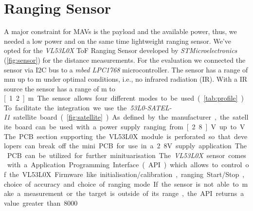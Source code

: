 \section{Ranging Sensor}
\label{sec:ranging sensor}
A major constraint for MAVs is the payload and the available power, thus, we needed a low power and on the same time lightweight ranging sensor. We've opted for the \textit{VL53L0X} ToF Ranging Sensor developed by \textit{STMicroelectronics} (\cref{fig:sensor}) for the distance measurements. For the evaluation we connected the sensor via I2C bus to a \textit{mbed LPC1768} microcontroller. The sensor has a range of \unit[0]{mm} up to \unit[2]{m} under optimal conditions, i.e., no infrared radiation (IR). With a IR source the sensor has a range of \unit[0]{m} to \unit[1.2]{m}.  The sensor allows four different modes to be used (\cref{tab:profile}). To facilitate the integration we use the \textit{53L0-SATEL-I1} satellite board (\cref{fig:satellite}). As defined by the manufacturer, the satellite board can be used with a power supply ranging from \unit[2.8]{V} up to \unit[5]{V}. The PCB section supporting the VL53L0X module is perforated so that developers can break off the mini PCB for use in a 2.8V supply application. The PCB can be utilized for further minituarisation. The \textit{VL53L0X} sensor comes with a Application Programming Interface (API) which allows to control of the VL53L0X Firmware like initialisation/calibration, ranging Start/Stop, choice of accuracy and choice of ranging mode. If the sensor is not able to make a measurement or the target is outside of its range, the API returns a value greater than 8000 \cite{VL53L0X}.\\
